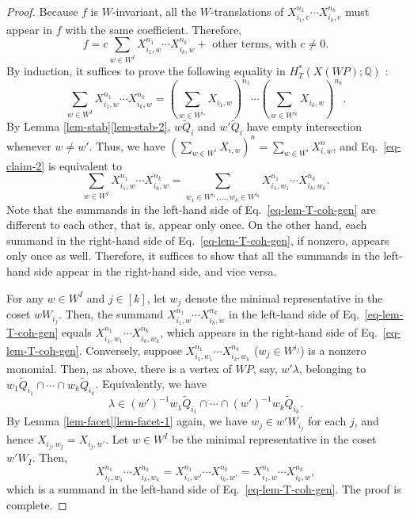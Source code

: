 \documentclass[10pt,a4paper]{amsart}
\begin{document}
\begin{proof}
    Because $f$ is $W$-invariant, all the $W$-translations of $X_{i_1, e}^{n_1} \cdots X_{i_k, e}^{n_k}$ must appear in $f$ with the same coefficient.
    Therefore, 
    \[f = c \sum_{w \in W^I} X_{i_1, w}^{n_1} \cdots X_{i_k, w}^{n_k} + \text{ other terms, with $c \ne 0$}.\]
    By induction, it suffices to prove the following equality in $H^*_T(X(\mathit{WP}) ; \mathbb{Q})$ :
    \begin{equation} \label{eq-claim-2}
        \sum_{w \in W^I} X_{i_1, w}^{n_1} \cdots X_{i_k, w}^{n_k} = \left( \sum_{w \in W^{i_1}} X_{i_1,w} \right)^{n_1} \cdots \left( \sum_{w \in W^{i_k}} X_{i_k,w} \right)^{n_k}.
    \end{equation}
    By Lemma \ref{lem-stab}\eqref{lem-stab-2}, $w \widetilde{Q}_i$ and $w' \widetilde{Q}_i$ have empty intersection whenever $w \ne w'$.
    Thus, we have $(\sum_{w \in W^i} X_{i,w})^n = \sum_{w \in W^i} X_{i,w}^n$, and Eq.~\eqref{eq-claim-2} is equivalent to 
    \begin{equation} \label{eq-lem-T-coh-gen}
        \sum_{w \in W^I} X_{i_1, w}^{n_1} \cdots X_{i_k, w}^{n_k} =  \sum_{w_1 \in W^{i_1}, \dots, w_k \in W^{i_k}} X_{i_1,w_1}^{n_1}  \cdots  X_{i_k,w_k}^{n_k}.
    \end{equation}
    Note that the summands in the left-hand side of Eq.~\eqref{eq-lem-T-coh-gen} are different to each other, that is, appear only once.
    On the other hand, each summand in the right-hand side of Eq.~\eqref{eq-lem-T-coh-gen}, if nonzero, appears only once as well.
    Therefore, it suffices to show that all the summands in the left-hand side appear in the right-hand side, and vice versa.

    For any $w \in W^I$ and $j \in [k]$, let $w_j$ denote the minimal representative in the coset $wW_{i_j}$.
    Then, the summand $X_{i_1, w}^{n_1} \cdots X_{i_k, w}^{n_k}$ in the left-hand side of Eq.~\eqref{eq-lem-T-coh-gen} equals $X_{i_1, w_1}^{n_1} \cdots X_{i_k, w_k}^{n_k}$, which appears in the right-hand side of Eq.~\eqref{eq-lem-T-coh-gen}.
    Conversely, suppose $X_{i_1, w_1}^{n_1} \cdots X_{i_k, w_k}^{n_k}$ ($w_j \in W^{i_j}$) is a nonzero monomial.
    Then, as above, there is a vertex of $\mathit{WP}$, say, $w' \lambda$, belonging to $w_1 \widetilde{Q}_{i_1} \cap \cdots \cap w_k \widetilde{Q}_{i_k}$.
    Equivalently, we have
    \[\lambda \in (w')^{-1} w_1 \widetilde{Q}_{i_1} \cap \cdots \cap (w')^{-1} w_k \widetilde{Q}_{i_k}.\]
    By Lemma \ref{lem-facet}\eqref{lem-facet-1} again, we have $w_j \in w'W_{i_j}$ for each $j$, and hence $X_{i_j,w_j} = X_{i_j, w'}$.
    Let $w \in W^I$ be the minimal representative in  the coset $w' W_I$.
    Then, 
    \[X_{i_1, w_1}^{n_1} \cdots X_{i_k, w_k}^{n_k} = X_{i_1, w'}^{n_1} \cdots X_{i_k, w'}^{n_k}= X_{i_1, w}^{n_1} \cdots X_{i_k, w}^{n_k},\]
    which is a summand in the left-hand side of Eq.~\eqref{eq-lem-T-coh-gen}.
    The proof is complete.
\end{proof}
\end{document}
